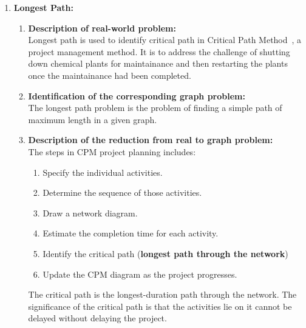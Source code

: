\documentclass[article, 10pt,onecolumn]{article}
\begin{document}
\begin{enumerate}
\begin{enumerate}
\end{enumerate}
 
\item \textbf{Longest Path:} 
 \begin{enumerate}
   \item \textbf{Description of real-world problem:}\\
    Longest path is used to identify critical path in Critical Path Method~\cite{cpm}, a project
    management method. It is to address the challenge of shutting down chemical plants for maintainance and then restarting the plants once
    the maintainance had been completed. 
   \item \textbf{Identification of the corresponding graph problem:}\\
    The longest path problem is the problem of finding a simple path of maximum length in a given graph.
   \item \textbf{Description of the reduction from real to graph problem:}\\
    The steps in CPM project planning includes: 
    \begin{enumerate}
	    \item Specify the individual activities.
	    \item Determine the sequence of those activities.
	    \item Draw a network diagram.
	    \item Estimate the completion time for each activity.
	    \item Identify the critical path (\textbf{longest path through the network})
	    \item Update the CPM diagram as the project progresses.
    \end{enumerate}
    The critical path is the longest-duration path through the network. The significance of the critical path is that the activities lie on
    it cannot be delayed without delaying the project.
 \end{enumerate}
\end{enumerate}


\end{document}
